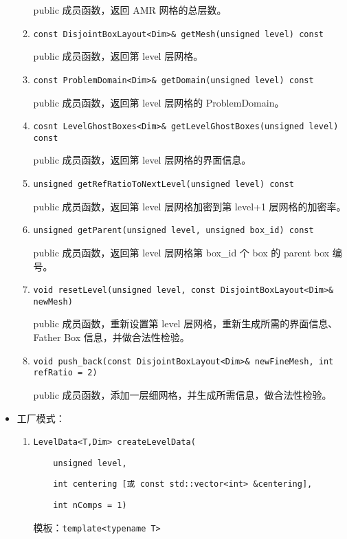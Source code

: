 \documentclass[cn, bibend=bibtex]{elegantpaper}
\theoremstyle{plain}
\begin{document}
\begin{itemize}
\begin{enumerate}
    public 成员函数，返回 AMR 网格的总层数。
    \item \lstinline|const DisjointBoxLayout<Dim>& getMesh(unsigned level) const|

    public 成员函数，返回第 level 层网格。
    \item \lstinline|const ProblemDomain<Dim>& getDomain(unsigned level) const|

    public 成员函数，返回第 level 层网格的 ProblemDomain。

    \item \lstinline|cosnt LevelGhostBoxes<Dim>& getLevelGhostBoxes(unsigned level) const|

    public 成员函数，返回第 level 层网格的界面信息。

    \item \lstinline|unsigned getRefRatioToNextLevel(unsigned level) const|

    public 成员函数，返回第 level 层网格加密到第 level+1 层网格的加密率。

    \item \lstinline|unsigned getParent(unsigned level, unsigned box_id) const|

    public 成员函数，返回第 level 层网格第 box\_id 个 box 的 parent box 编号。

    \item \lstinline|void resetLevel(unsigned level, const DisjointBoxLayout<Dim>& newMesh)|

    public 成员函数，重新设置第 level 层网格，重新生成所需的界面信息、
    Father Box 信息，并做合法性检验。

    \item \lstinline|void push_back(const DisjointBoxLayout<Dim>& newFineMesh, int refRatio = 2)|

    public 成员函数，添加一层细网格，并生成所需信息，做合法性检验。
  \end{enumerate}

  \item 工厂模式：
  \begin{enumerate}
    \item \lstinline|LevelData<T,Dim> createLevelData(|
    
    \lstinline|    unsigned level, |
    
    \lstinline|    int centering [或 const std::vector<int> &centering], |
    
    \lstinline|    int nComps = 1)|

    模板：\lstinline|template<typename T>|


\end{enumerate}
\end{itemize}
\end{document}
